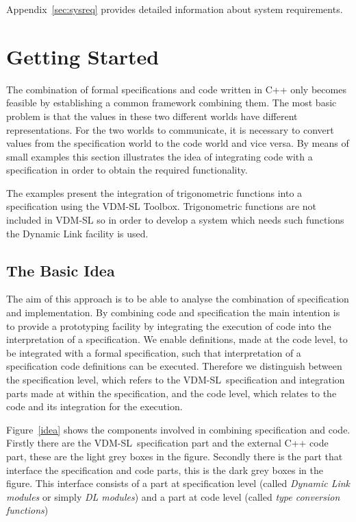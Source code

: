 \documentclass[\pformat,12pt]{article}
\newcommand{\vdmslpp}{VDM-SL}
\begin{document}
Appendix~\ref{sec:sysreq} provides detailed information about system
requirements.


\section{Getting Started}
\label{getting-started}

The combination of formal specifications and code written in C++ only
becomes feasible by establishing a common framework combining them.
The most basic problem is that the values in these two different
worlds have different representations. For the two worlds to
communicate, it is necessary to convert values from the specification
world to the code world and vice versa.  By means of small examples
this section illustrates the idea of integrating code with a
specification in order to obtain the required functionality.

The examples present the integration of trigonometric functions into a
specification using the VDM-SL Toolbox.  Trigonometric functions
are not included in VDM-SL so in order to develop a system which needs
such functions the Dynamic Link facility is used.

\subsection{The Basic Idea}

The aim of this approach is to be able to analyse the combination of
specification and implementation. By combining code and specification
the main intention is to provide a prototyping facility by integrating
the execution of code into the interpretation of a specification.  We
enable definitions, made at the code level, to be integrated with a
formal specification, such that interpretation of a specification code
definitions can be executed.  Therefore we distinguish between the
specification level, which refers to the \vdmslpp\ specification and
integration parts made at within the specification, and the code
level, which relates to the code and its integration for the
execution.

Figure~\ref{idea} shows the components involved in combining
specification and code. Firstly there are the \vdmslpp\ specification
part and the external C++ code part, these are the light grey boxes in
the figure. Secondly there is the part that interface the
specification and code parts, this is the dark grey boxes in the
figure. This interface consists of a part at specification level
(called {\em Dynamic Link modules\/} or simply {\em DL modules\/}) and
a part at code level (called {\em type conversion functions\/})
\end{document}
